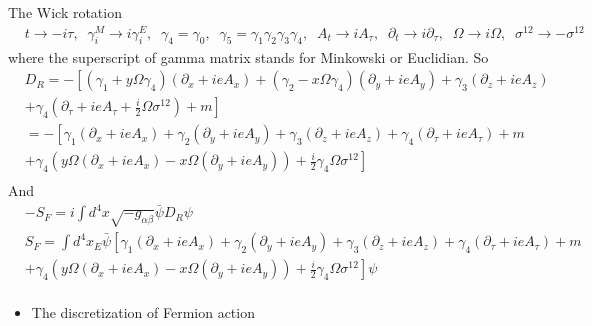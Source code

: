 The Wick rotation
\begin{equation}
\begin{split}
&t\to -i\tau,\;\;\gamma _i^{M}\to i\gamma _i^{E},\;\;\gamma _4=\gamma _0,\;\;\gamma _5=\gamma _1\gamma _2\gamma _3\gamma _4,\;\;A_t\to i A_{\tau},\;\;\partial _t\to i\partial _{\tau},\;\;\Omega \to i\Omega,\;\;\sigma ^{12}\to -\sigma ^{12}
\end{split}
\end{equation}
where the superscript of gamma matrix stands for Minkowski or Euclidian. So
\begin{equation}
\begin{split}
&D_R=-\left[(\gamma _1+y\Omega \gamma_4) (\partial _x+ieA_x)+(\gamma _2-x\Omega \gamma_4) (\partial _y+ieA_y)+\gamma _3 (\partial _z+ieA_z)\right.\\
&\left.+\gamma _4 (\partial _{\tau}+ieA_{\tau}+\frac{i}{2}\Omega \sigma ^{12})+m\right]\\
&=-\left[\gamma _1 (\partial _x+ieA_x)+\gamma _2(\partial _y+ieA_y)+\gamma _3 (\partial _z+ieA_z)+\gamma _4 (\partial _{\tau}+ieA_{\tau})+m\right.\\
&\left.+\gamma _4 \left(y\Omega(\partial _x+ieA_x)-x\Omega(\partial _y+ieA_y)\right)+\frac{i}{2}\gamma _4\Omega \sigma ^{12}\right]\\
\end{split}
\end{equation}
And
\begin{equation}
\begin{split}
&-S_F=i\int d^4 x \sqrt{-g_{\alpha \beta}}\bar{\psi } D_R \psi\\
&S_F=\int d^4 x_E \bar{\psi } \left[\gamma _1 (\partial _x+ieA_x)+\gamma _2(\partial _y+ieA_y)+\gamma _3 (\partial _z+ieA_z)+\gamma _4 (\partial _{\tau}+ieA_{\tau})+m\right.\\
&\left.+\gamma _4 \left(y\Omega(\partial _x+ieA_x)-x\Omega(\partial _y+ieA_y)\right)+\frac{i}{2}\gamma _4\Omega \sigma ^{12}\right] \psi\\
\end{split}
\end{equation}

\begin{itemize}
  \item The discretization of Fermion action
\end{itemize}

